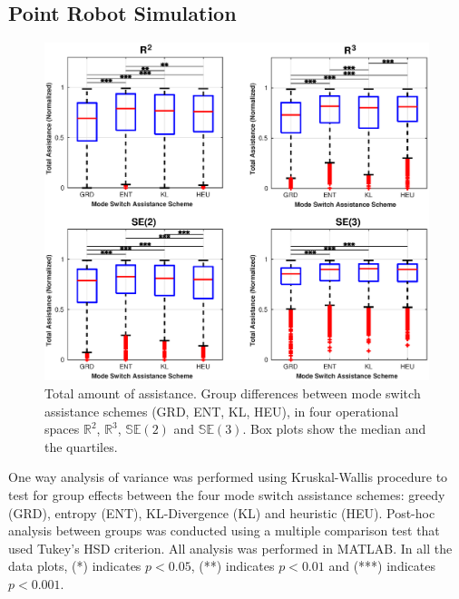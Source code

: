 \documentclass[conference]{IEEEtran}
\begin{document}
\subsection{Point Robot Simulation}
\begin{figure}[t]
	\centering
	\includegraphics[width= 1.\hsize, height=0.3\vsize]{./figures/total_assistance.eps}
	\vspace{-0.8cm}
	\caption{Total amount of assistance. Group differences between mode switch assistance schemes (GRD, ENT, KL, HEU), in four operational spaces $\mathbb{R}^2$, $\mathbb{R}^3$, $\mathbb{SE}(2)$ and $\mathbb{SE}(3)$. Box plots show the median and the quartiles.} 
	\label{fig:total_assistance}
\end{figure}
One way analysis of variance was performed using Kruskal-Wallis procedure to test for group effects  between the four mode switch assistance schemes: greedy (GRD), entropy (ENT), KL-Divergence (KL) and heuristic (HEU). Post-hoc analysis between groups was conducted using a multiple comparison test that used Tukey's HSD criterion. All analysis was performed in MATLAB. In all the data plots, (*) indicates $p < 0.05$, (**) indicates $p < 0.01$ and (***) indicates $p < 0.001$.
\end{document}
